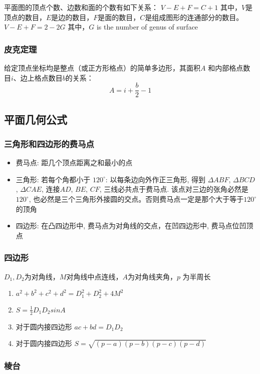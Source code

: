 \documentclass[landscape,a4paper]{article}
\begin{document}
\begin{spacing}{0.3}
\begin{multicols}{2}
平面图的顶点个数、边数和面的个数有如下关系：
	$V - E + F = C+ 1$
\indent 其中，$V$是顶点的数目，$E$是边的数目，$F$是面的数目，$C$是组成图形的连通部分的数目。
$V - E + F = 2 - 2G$
\indent 其中，$G$ is the number of genus of surface

\subsubsection{皮克定理}

给定顶点坐标均是整点（或正方形格点）的简单多边形，其面积$A$ 和内部格点数目$i$、边上格点数目$b$的关系：
	$$A = i + \frac{b}{2} - 1$$


\subsection{平面几何公式}
\subsubsection{三角形和四边形的费马点}
  \begin{itemize}
  \item 费马点: 距几个顶点距离之和最小的点
  \item 三角形:
      若每个角都小于 $120^{\circ}$: 以每条边向外作正三角形, 得到 $\Delta ABF$, $\Delta BCD$, $\Delta CAE$, 连接$AD$, $BE$, $CF$, 三线必共点于费马点. 该点对三边的张角必然是$120^{\circ}$, 也必然是三个三角形外接圆的交点。否则费马点一定是那个大于等于$120^{\circ}$的顶角
  \item 四边形:
        在凸四边形中, 费马点为对角线的交点，在凹四边形中, 费马点位凹顶点
\end{itemize}
\subsubsection{四边形}

$D_1, D_2$为对角线，$M$对角线中点连线，$A$为对角线夹角，$p$ 为半周长
\begin{enumerate}
	\item $a^2+b^2+c^2+d^2=D_1^2+D_2^2+4M^2$
	\item $S=\frac{1}{2}D_1D_2sinA$
	\item 对于圆内接四边形
		$ac+bd=D_1D_2$
	\item 对于圆内接四边形
		$S=\sqrt{(p-a)(p-b)(p-c)(p-d)}$
\end{enumerate}

\subsubsection{棱台}


\end{multicols}
\end{spacing}
\end{document}
